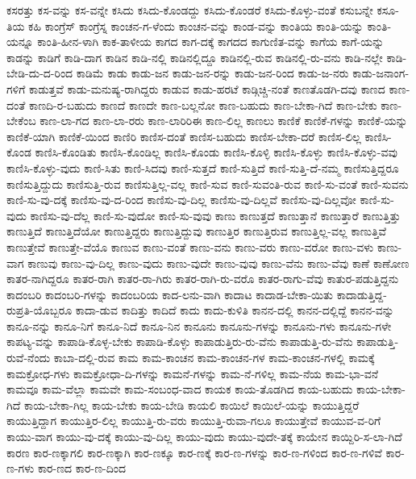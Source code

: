 {ಕಸರತ್ತು
ಕಸ-ವನ್ನು
ಕಸ-ವನ್ನೇ
ಕಸಿದು
ಕಸಿದು-ಕೊಂಡದ್ದು
ಕಸಿದು-ಕೊಂಡರೆ
ಕಸಿದು-ಕೊಳ್ಳು-ವಂತೆ
ಕಸುಬನ್ನೇ
ಕಸೂ-ತಿಯ
ಕಹಿ
ಕಾಂಗ್ರೆಸ್
ಕಾಂಗ್ರೆಸ್ನ
ಕಾಂಚನ-ಗ-ಳೆಂದು
ಕಾಂಚನ-ವನ್ನು
ಕಾಂಡ-ವನ್ನು
ಕಾಂತಿಯ
ಕಾಂತಿ-ಯನ್ನು
ಕಾಂತಿ-ಯನ್ನೂ
ಕಾಂತಿ-ಹೀನ-ಳಾಗಿ
ಕಾಕ-ತಾಳೀಯ
ಕಾಗದ
ಕಾಗ-ದಕ್ಕೆ
ಕಾಗದದ
ಕಾಗುಣಿತ-ವನ್ನು
ಕಾಗೆಯ
ಕಾಗೆ-ಯನ್ನು
ಕಾಡನ್ನು
ಕಾಡಿಗೆ
ಕಾಡಿ-ದಾಗ
ಕಾಡಿನ
ಕಾಡಿ-ನಲ್ಲಿ
ಕಾಡಿನಲ್ಲಿದ್ದೂ
ಕಾಡಿನಲ್ಲಿ-ರುವ
ಕಾಡಿನಲ್ಲಿ-ರು-ವನು
ಕಾಡಿ-ನಲ್ಲೇ
ಕಾಡಿ-ಬೇಡಿ-ದು-ದ-ರಿಂದ
ಕಾಡಿಮೆ
ಕಾಡು
ಕಾಡು-ಜನ
ಕಾಡು-ಜನ-ರನ್ನು
ಕಾಡು-ಜನ-ರಿಂದ
ಕಾಡು-ಜ-ನರು
ಕಾಡು-ಜನಾಂಗ-ಗಳಿಗೆ
ಕಾಡುತ್ತವೆ
ಕಾಡು-ಮನುಷ್ಯ-ರಾಗಿದ್ದರು
ಕಾಡುವ
ಕಾಡು-ಹರಟೆ
ಕಾಡ್ಗಿಚ್ಚಿ-ನಂತೆ
ಕಾಣತೊಡಗಿ-ದವು
ಕಾಣದ
ಕಾಣ-ದಂತೆ
ಕಾಣದಿ-ರ-ಬಹುದು
ಕಾಣದೆ
ಕಾಣದೇ
ಕಾಣ-ಬಲ್ಲನೋ
ಕಾಣ-ಬಹುದು
ಕಾಣ-ಬೇಕಾ-ಗಿದೆ
ಕಾಣ-ಬೇಕು
ಕಾಣ-ಬೇಕೆಂಬ
ಕಾಣ-ಲಾ-ಗದ
ಕಾಣ-ಲಾ-ರರು
ಕಾಣ-ಲಾರಿರಿಈ
ಕಾಣ-ಲಿಲ್ಲ
ಕಾಣಲು
ಕಾಣಿಕೆ
ಕಾಣಿಕೆ-ಗಳನ್ನು
ಕಾಣಿಕೆ-ಯನ್ನು
ಕಾಣಿಕೆ-ಯಾಗಿ
ಕಾಣಿಕೆ-ಯಿಂದ
ಕಾಣಿರಿ
ಕಾಣಿಸ-ದಂತೆ
ಕಾಣಿಸ-ಬಹುದು
ಕಾಣಿಸ-ಬೇಕಾ-ದರೆ
ಕಾಣಿಸ-ಲಿಲ್ಲ
ಕಾಣಿಸಿ-ಕೊಂಡ
ಕಾಣಿಸಿ-ಕೊಂಡಿತು
ಕಾಣಿಸಿ-ಕೊಂಡಿಲ್ಲ
ಕಾಣಿಸಿ-ಕೊಂಡು
ಕಾಣಿಸಿ-ಕೊಳ್ಳಿ
ಕಾಣಿಸಿ-ಕೊಳ್ಳು
ಕಾಣಿಸಿ-ಕೊಳ್ಳು-ವವು
ಕಾಣಿಸಿ-ಕೊಳ್ಳು-ವುದು
ಕಾಣಿ-ಸಿತು
ಕಾಣಿ-ಸಿದವು
ಕಾಣಿ-ಸುತ್ತದೆ
ಕಾಣಿ-ಸುತ್ತಿದೆ
ಕಾಣಿ-ಸುತ್ತಿ-ದೆ-ನಮ್ಮ
ಕಾಣಿಸುತ್ತಿದ್ದರೂ
ಕಾಣಿಸುತ್ತಿದ್ದುದು
ಕಾಣಿಸುತ್ತಿ-ರುವ
ಕಾಣಿಸುತ್ತಿಲ್ಲ-ವಲ್ಲ
ಕಾಣಿ-ಸುವ
ಕಾಣಿ-ಸುವಂತಿ-ರುವ
ಕಾಣಿ-ಸು-ವಂತೆ
ಕಾಣಿ-ಸುವನು
ಕಾಣಿ-ಸು-ವು-ದಕ್ಕೆ
ಕಾಣಿಸು-ವು-ದ-ರಿಂದ
ಕಾಣಿಸು-ವು-ದಿಲ್ಲ
ಕಾಣಿಸು-ವು-ದಿಲ್ಲವೆ
ಕಾಣಿಸು-ವು-ದಿಲ್ಲವೋ
ಕಾಣಿ-ಸು-ವುದು
ಕಾಣಿಸು-ವು-ದೆಲ್ಲ
ಕಾಣಿ-ಸು-ವುದೋ
ಕಾಣಿ-ಸು-ವುವು
ಕಾಣು
ಕಾಣುತ್ತದೆ
ಕಾಣುತ್ತಾನೆ
ಕಾಣುತ್ತಾರೆ
ಕಾಣುತ್ತಿತ್ತು
ಕಾಣುತ್ತಿದೆ
ಕಾಣುತ್ತಿದೆಯೋ
ಕಾಣುತ್ತಿದ್ದರು
ಕಾಣುತ್ತಿದ್ದುವು
ಕಾಣುತ್ತಿರ
ಕಾಣುತ್ತಿರುವ
ಕಾಣುತ್ತಿಲ್ಲ-ವಲ್ಲ
ಕಾಣುತ್ತಿವೆ
ಕಾಣುತ್ತೇವೆ
ಕಾಣುತ್ತೇ-ವೆಯೊ
ಕಾಣುವ
ಕಾಣು-ವಂತೆ
ಕಾಣು-ವನು
ಕಾಣು-ವರು
ಕಾಣು-ವರೋ
ಕಾಣು-ವಳು
ಕಾಣು-ವಾಗ
ಕಾಣುವು
ಕಾಣು-ವು-ದಿಲ್ಲ
ಕಾಣು-ವುದು
ಕಾಣು-ವುದೇ
ಕಾಣು-ವುವು
ಕಾಣು-ವೆನು
ಕಾಣು-ವೆವು
ಕಾಣೆ
ಕಾಣೋಣ
ಕಾತರ-ನಾಗಿದ್ದರೂ
ಕಾತರ-ರಾಗಿ
ಕಾತರ-ರಾ-ಗಿರು
ಕಾತರ-ರಾಗಿ-ರು-ವರೊ
ಕಾತರ-ರಾಗು-ವೆವು
ಕಾತುರ-ಪಡುತ್ತಿದ್ದನು
ಕಾದಂಬರಿ
ಕಾದಂಬರಿ-ಗಳನ್ನು
ಕಾದಂಬರಿಯ
ಕಾದ-ಲನು-ವಾಗಿ
ಕಾದಾಟ
ಕಾದಾಡ-ಬೇಕಾ-ಯಿತು
ಕಾದಾಡುತ್ತಿದ್ದ-ರುಪ್ರತಿ-ಯೊಬ್ಬರೂ
ಕಾದಾ-ಡುವ
ಕಾದಿತ್ತು
ಕಾದಿದೆ
ಕಾದು
ಕಾದು-ಕುಳಿತಿ
ಕಾನನ-ದಲ್ಲಿ
ಕಾನನ-ದಲ್ಲಿದ್ದೆ
ಕಾನನ-ವನ್ನು
ಕಾನೂ-ನನ್ನು
ಕಾನೂ-ನಿಗೆ
ಕಾನೂ-ನಿದೆ
ಕಾನೂ-ನಿನ
ಕಾನೂನು
ಕಾನೂನು-ಗಳನ್ನು
ಕಾನೂನು-ಗಳು
ಕಾನೂನು-ಗಳೇ
ಕಾಪಟ್ಯ-ವನ್ನು
ಕಾಪಾಡಿ-ಕೊಳ್ಳ-ಬೇಕು
ಕಾಪಾಡಿ-ಕೊಳ್ಳು
ಕಾಪಾಡುತ್ತಿರು-ರು-ವೆನು
ಕಾಪಾಡುತ್ತಿ-ರು-ವೆನು
ಕಾಪಾಡುತ್ತಿ-ರುವೆ-ನೆಂದು
ಕಾಬಾ-ದಲ್ಲಿ-ರುವ
ಕಾಮ
ಕಾಮ-ಕಾಂಚನ
ಕಾಮ-ಕಾಂಚನ-ಗಳ
ಕಾಮ-ಕಾಂಚನ-ಗಳಲ್ಲಿ
ಕಾಮಕ್ಕೆ
ಕಾಮಕ್ರೋಧ-ಗಳು
ಕಾಮಕ್ರೋಧಾ-ದಿ-ಗಳನ್ನು
ಕಾಮನೆ-ಗಳನ್ನು
ಕಾಮ-ನೆ-ಗಳಿಲ್ಲ
ಕಾಮ-ನೆಯ
ಕಾಮ-ಭಾ-ವನೆ
ಕಾಮವೂ
ಕಾಮ-ವೆಲ್ಲಾ
ಕಾಮವೇ
ಕಾಮ-ಸಂಬಂಧ-ವಾದ
ಕಾಯಕ
ಕಾಯ-ತೊಡಗಿದ
ಕಾಯ-ಬಹುದು
ಕಾಯ-ಬೇಕಾ-ಗಿದೆ
ಕಾಯ-ಬೇಕಾ-ಗಿಲ್ಲ
ಕಾಯ-ಬೇಕು
ಕಾಯ-ಬೇಡಿ
ಕಾಯಲಿ
ಕಾಯಿಲೆ
ಕಾಯಿಲೆ-ಯನ್ನು
ಕಾಯುತ್ತಿದ್ದರೆ
ಕಾಯುತ್ತಿದ್ದಾಗ
ಕಾಯುತ್ತಿರ-ಲಿಲ್ಲ
ಕಾಯುತ್ತಿ-ರು-ವರು
ಕಾಯುತ್ತಿ-ರುವಾ-ಗಲೂ
ಕಾಯುತ್ತೇವೆ
ಕಾಯುವ-ವ-ರಿಗೆ
ಕಾಯು-ವಾಗ
ಕಾಯು-ವು-ದಕ್ಕೆ
ಕಾಯು-ವು-ದಿಲ್ಲ
ಕಾಯು-ವುದು
ಕಾಯು-ವುದೇ-ತಕ್ಕೆ
ಕಾಯೇನ
ಕಾಯ್ದಿರಿ-ಸ-ಲಾ-ಗಿದೆ
ಕಾರಣ
ಕಾರ-ಣಕ್ಕಾಗಲಿ
ಕಾರ-ಣಕ್ಕಾಗಿ
ಕಾರ-ಣಕ್ಕೂ
ಕಾರ-ಣಕ್ಕೆ
ಕಾರ-ಣ-ಗಳನ್ನು
ಕಾರ-ಣ-ಗಳಿಂದ
ಕಾರ-ಣ-ಗಳಿವೆ
ಕಾರ-ಣ-ಗಳು
ಕಾರ-ಣದ
ಕಾರ-ಣ-ದಿಂದ
}
